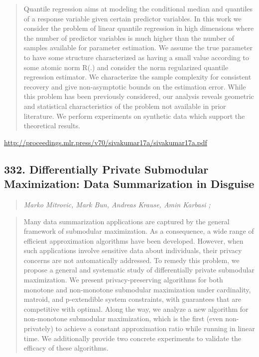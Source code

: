 \documentclass{article}
\begin{document}
\begin{quote}
    Quantile regression aims at modeling the conditional median and quantiles of a response variable given certain predictor variables. In this work we consider the problem of linear quantile regression in high dimensions where the number of predictor variables is much higher than the number of samples available for parameter estimation. We assume the true parameter to have some structure characterized as having a small value according to some atomic norm R(.) and consider the norm regularized quantile regression estimator. We characterize the sample complexity for consistent recovery and give non-asymptotic bounds on the estimation error. While this problem has been previously considered, our analysis reveals geometric and statistical characteristics of the problem not available in prior literature. We perform experiments on synthetic data which support the theoretical results.  \end{quote}

\href{http://proceedings.mlr.press/v70/sivakumar17a/sivakumar17a.pdf}{http://proceedings.mlr.press/v70/sivakumar17a/sivakumar17a.pdf}

\subsection{332. Differentially Private Submodular Maximization: Data Summarization in Disguise}

\begin{quote}
\footnotesize{\textit{Marko Mitrovic, Mark Bun, Andreas Krause, Amin Karbasi ;}}
\end{quote}

\begin{quote}
    Many data summarization applications are captured by the general framework of submodular maximization. As a consequence, a wide range of efficient approximation algorithms have been developed. However, when such applications involve sensitive data about individuals, their privacy concerns are not automatically addressed. To remedy this problem, we propose a general and systematic study of differentially private submodular maximization. We present privacy-preserving algorithms for both monotone and non-monotone submodular maximization under cardinality, matroid, and p-extendible system constraints, with guarantees that are competitive with optimal. Along the way, we analyze a new algorithm for non-monotone submodular maximization, which is the first (even non-privately) to achieve a constant approximation ratio while running in linear time. We additionally provide two concrete experiments to validate the efficacy of these algorithms.  \end{quote}
\end{document}
